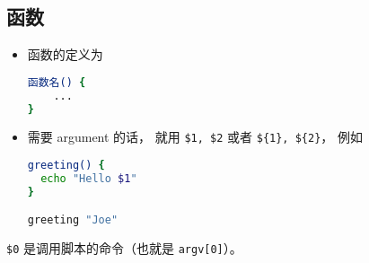 \subsection{函数}

\begin{itemize}
\item 函数的定义为
\begin{lstlisting}[language=bash]
函数名() {
	...
}
\end{lstlisting}
\item 需要 argument 的话， 就用 \verb|$1, $2| 或者 \verb|${1}, ${2}|， 例如
\begin{lstlisting}[language=bash]
greeting() {
  echo "Hello $1"
}

greeting "Joe"
\end{lstlisting}
\end{itemize}

\verb|$0| 是调用脚本的命令（也就是 \verb|argv[0]|）。
